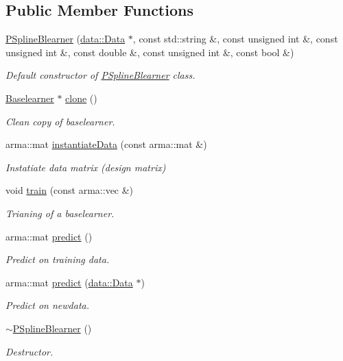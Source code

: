 \subsection*{Public Member Functions}
\begin{DoxyCompactItemize}
\item 
\hyperlink{classblearner_1_1_p_spline_blearner_a58ec2c4bf9d0da690dd1b433c6755a87}{P\+Spline\+Blearner} (\hyperlink{classdata_1_1_data}{data\+::\+Data} $\ast$, const std\+::string \&, const unsigned int \&, const unsigned int \&, const double \&, const unsigned int \&, const bool \&)
\begin{DoxyCompactList}\small\item\em Default constructor of {\ttfamily \hyperlink{classblearner_1_1_p_spline_blearner}{P\+Spline\+Blearner}} class. \end{DoxyCompactList}\item 
\hyperlink{classblearner_1_1_baselearner}{Baselearner} $\ast$ \hyperlink{classblearner_1_1_p_spline_blearner_a6fca532d2d20dfa284acc474ee1d7531}{clone} ()
\begin{DoxyCompactList}\small\item\em Clean copy of baselearner. \end{DoxyCompactList}\item 
arma\+::mat \hyperlink{classblearner_1_1_p_spline_blearner_ac0604daac451678e67a6a2ac60dd1b01}{instantiate\+Data} (const arma\+::mat \&)
\begin{DoxyCompactList}\small\item\em Instatiate data matrix (design matrix) \end{DoxyCompactList}\item 
void \hyperlink{classblearner_1_1_p_spline_blearner_aa5c18ceb8396ffce556588486d574be8}{train} (const arma\+::vec \&)
\begin{DoxyCompactList}\small\item\em Trianing of a baselearner. \end{DoxyCompactList}\item 
arma\+::mat \hyperlink{classblearner_1_1_p_spline_blearner_aa46e4474a352876fbfad64921254f6d5}{predict} ()
\begin{DoxyCompactList}\small\item\em Predict on training data. \end{DoxyCompactList}\item 
arma\+::mat \hyperlink{classblearner_1_1_p_spline_blearner_a9d35aeb36c403c167fb7519379825873}{predict} (\hyperlink{classdata_1_1_data}{data\+::\+Data} $\ast$)
\begin{DoxyCompactList}\small\item\em Predict on newdata. \end{DoxyCompactList}\item 
\hyperlink{classblearner_1_1_p_spline_blearner_ac2d4d8cb7462735d944b6aa69896374d}{$\sim$\+P\+Spline\+Blearner} ()
\begin{DoxyCompactList}\small\item\em Destructor. \end{DoxyCompactList}\end{DoxyCompactItemize}
